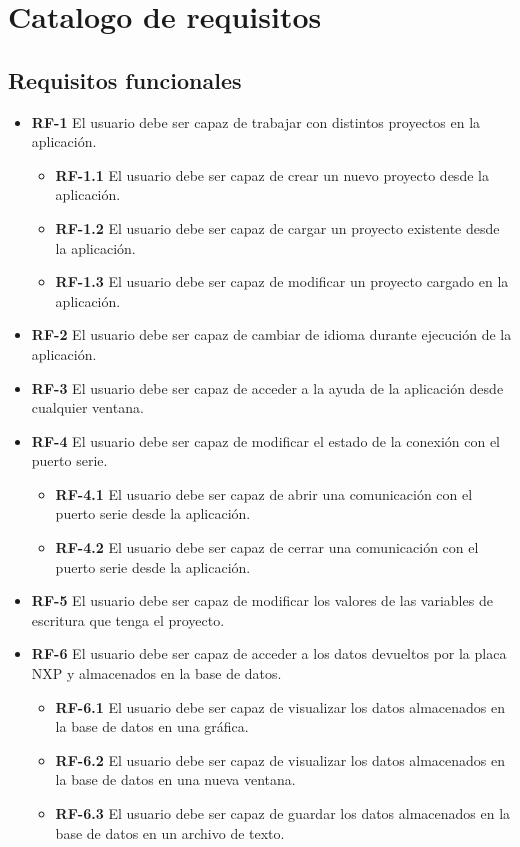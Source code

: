 \section{Catalogo de requisitos}

\subsection{Requisitos funcionales}

\begin{itemize}
	\item \textbf{RF-1} El usuario debe ser capaz de trabajar con distintos proyectos en la aplicación.
	\begin{itemize}
		\item \textbf{RF-1.1} El usuario debe ser capaz de crear un nuevo proyecto desde la aplicación.
		\item \textbf{RF-1.2} El usuario debe ser capaz de cargar un proyecto existente desde la aplicación.
		\item \textbf{RF-1.3} El usuario debe ser capaz de modificar un proyecto cargado en la aplicación.	
	\end{itemize}
	\item \textbf{RF-2} El usuario debe ser capaz de cambiar de idioma durante ejecución de la aplicación.
	\item \textbf{RF-3} El usuario debe ser capaz de acceder a la ayuda de la aplicación desde cualquier ventana.
	\item \textbf{RF-4} El usuario debe ser capaz de modificar el estado de la conexión con el puerto serie.
	\begin{itemize}
		\item \textbf{RF-4.1} El usuario debe ser capaz de abrir una comunicación con el puerto serie desde la aplicación.
		\item \textbf{RF-4.2} El usuario debe ser capaz de cerrar una comunicación con el puerto serie desde la aplicación.
	\end{itemize}
	\item \textbf{RF-5} El usuario debe ser capaz de modificar los valores de las variables de escritura que tenga el proyecto.
	\item \textbf{RF-6} El usuario debe ser capaz de acceder a los datos devueltos por la placa NXP y almacenados en la base de datos.
	\begin{itemize}
		\item \textbf{RF-6.1} El usuario debe ser capaz de visualizar los datos almacenados en la base de datos en una gráfica.
		\item \textbf{RF-6.2} El usuario debe ser capaz de visualizar los datos almacenados en la base de datos en una nueva ventana.
		\item \textbf{RF-6.3} El usuario debe ser capaz de guardar los datos almacenados en la base de datos en un archivo de texto.
	\end{itemize}
	
\end{itemize}

